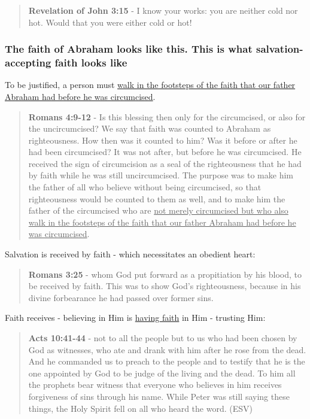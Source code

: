 \documentclass[11pt]{article}
\begin{document}
\begin{quote}
\textbf{Revelation of John 3:15} - I know your works: you are neither cold nor hot. Would that you were either cold or hot!
\end{quote}

\subsubsection{The faith of Abraham looks like this. This is what salvation-accepting faith looks like}
\label{sec:org6f3776d}
To be justified, a person must \uline{walk in the footsteps of the faith that our father Abraham had before he was circumcised}.

\begin{quote}
\textbf{Romans 4:9-12} - Is this blessing then only for the circumcised, or also for the uncircumcised? We say that faith was counted to Abraham as righteousness. How then was it counted to him? Was it before or after he had been circumcised? It was not after, but before he was circumcised. He received the sign of circumcision as a seal of the righteousness that he had by faith while he was still uncircumcised. The purpose was to make him the father of all who believe without being circumcised, so that righteousness would be counted to them as well, and to make him the father of the circumcised who are \uline{not merely circumcised but who also walk in the footsteps of the faith that our father Abraham had before he was circumcised}.
\end{quote}

Salvation is received by faith - which necessitates an obedient heart:

\begin{quote}
\textbf{Romans 3:25} - whom God put forward as a propitiation by his blood, to be received by faith. This was to show God's righteousness, because in his divine forbearance he had passed over former sins.
\end{quote}

Faith receives - believing in Him is \uline{having faith} in Him - trusting Him:

\begin{quote}
\textbf{Acts 10:41-44} - not to all the people but to us who had been chosen by God as witnesses, who ate and drank with him after he rose from the dead. And he commanded us to preach to the people and to testify that he is the one appointed by God to be judge of the living and the dead. To him all the prophets bear witness that everyone who believes in him receives forgiveness of sins through his name. While Peter was still saying these things, the Holy Spirit fell on all who heard the word. (ESV)
\end{quote}
\end{document}
